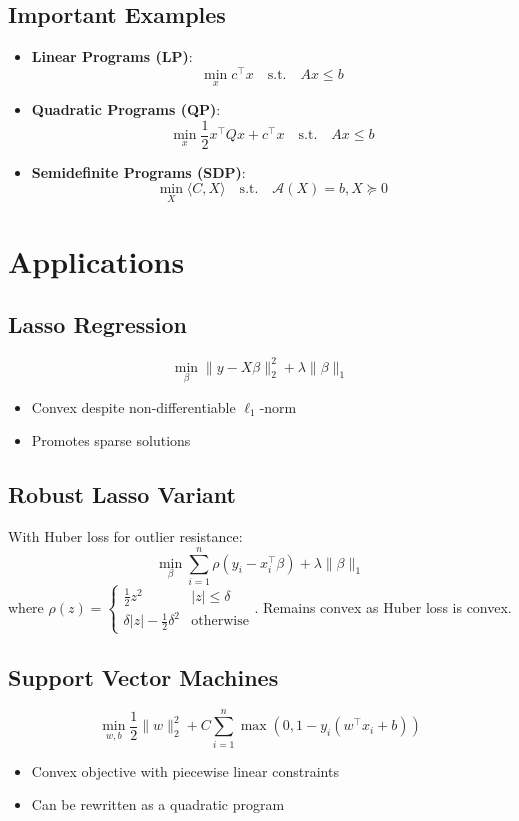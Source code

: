 \documentclass{article}
\theoremstyle{plain}
\begin{document}
\subsection{Important Examples}
\begin{itemize}
    \item \textbf{Linear Programs (LP)}:
    \[ \min_x c^\top x \quad \text{s.t.} \quad Ax \leq b \]
    
    \item \textbf{Quadratic Programs (QP)}:
    \[ \min_x \frac{1}{2}x^\top Q x + c^\top x \quad \text{s.t.} \quad Ax \leq b \]
    
    \item \textbf{Semidefinite Programs (SDP)}:
    \[ \min_X \langle C, X \rangle \quad \text{s.t.} \quad \mathcal{A}(X) = b, X \succeq 0 \]
\end{itemize}

\section{Applications}
\subsection{Lasso Regression}
\[
\min_\beta \|y - X\beta\|_2^2 + \lambda\|\beta\|_1
\]
\begin{itemize}
    \item Convex despite non-differentiable \( \ell_1 \)-norm
    \item Promotes sparse solutions
\end{itemize}

\subsection{Robust Lasso Variant} %
With Huber loss for outlier resistance:
\[
\min_\beta \sum_{i=1}^n \rho(y_i - x_i^\top\beta) + \lambda\|\beta\|_1
\]
where \( \rho(z) = \begin{cases} 
\frac{1}{2}z^2 & |z| \leq \delta \\
\delta|z| - \frac{1}{2}\delta^2 & \text{otherwise}
\end{cases} \). Remains convex as Huber loss is convex.

\subsection{Support Vector Machines}
\[
\min_{w,b} \frac{1}{2}\|w\|_2^2 + C\sum_{i=1}^n \max(0, 1 - y_i(w^\top x_i + b))
\]
\begin{itemize}
    \item Convex objective with piecewise linear constraints
    \item Can be rewritten as a quadratic program
\end{itemize}
\end{document}
